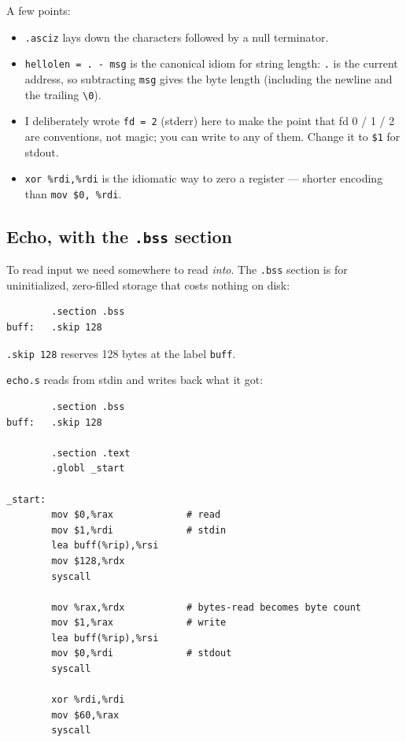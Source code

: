 \documentclass[11pt]{article}
\begin{document}
A few points:
\begin{itemize}
  \item \texttt{.asciz} lays down the characters followed by a null
    terminator.
  \item \texttt{hellolen = . - msg} is the canonical idiom for
    string length: \texttt{.} is the current address, so subtracting
    \texttt{msg} gives the byte length (including the newline and
    the trailing \texttt{\textbackslash 0}).
  \item I deliberately wrote \texttt{fd = 2} (stderr) here to make
    the point that fd 0 / 1 / 2 are conventions, not magic; you can
    write to any of them. Change it to \texttt{\$1} for stdout.
  \item \texttt{xor \%rdi,\%rdi} is the idiomatic way to zero a
    register --- shorter encoding than \texttt{mov \$0, \%rdi}.
\end{itemize}

\subsection*{Echo, with the \texttt{.bss} section}

To read input we need somewhere to read \emph{into}. The
\texttt{.bss} section is for uninitialized, zero-filled storage
that costs nothing on disk:

\begin{lstlisting}
        .section .bss
buff:   .skip 128
\end{lstlisting}

\texttt{.skip 128} reserves 128 bytes at the label \texttt{buff}.

\texttt{echo.s} reads from stdin and writes back what it got:

\begin{lstlisting}
        .section .bss
buff:   .skip 128

        .section .text
        .globl _start

_start:
        mov $0,%rax             # read
        mov $1,%rdi             # stdin
        lea buff(%rip),%rsi
        mov $128,%rdx
        syscall

        mov %rax,%rdx           # bytes-read becomes byte count
        mov $1,%rax             # write
        lea buff(%rip),%rsi
        mov $0,%rdi             # stdout
        syscall

        xor %rdi,%rdi
        mov $60,%rax
        syscall
\end{lstlisting}
\end{document}

